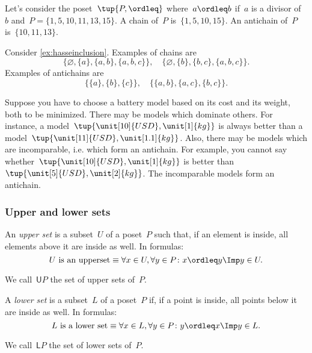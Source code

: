 \begin{example}
Let's consider the poset~$\tup{P,\ordleq}$ where~$a\ordleq b$ if~$a$ is a divisor of~$b$ and~$P=\{1,5,10,11,13,15\}$. A chain of~$P$ is~$\{1,5,10,15\}$. An antichain of~$P$ is~$\{10,11,13\}$.
\end{example}

\begin{example}
Consider \cref{ex:hasseinclusion}. Examples of chains are 
\begin{equation}
    \{\varnothing,\{a\},\{a,b\},\{a,b,c\}\}, \quad  \{\varnothing,\{b\},\{b,c\},\{a,b,c\}\}.
\end{equation}
Examples of antichains are
\begin{equation}
    \{\{a\},\{b\},\{c\}\}, \quad \{ \{a,b\},\{a,c\}, \{b,c\}\}.
\end{equation}
\end{example}

\begin{example}
\label{ex:battery}
Suppose you have to choose a battery model based on its cost and its weight, both to be minimized. There may be models which dominate others. For instance, a model~$\tup{\unit[10]{USD},\unit[1]{kg}}$ is always better than a model~$\tup{\unit[11]{USD},\unit[1.1]{kg}}$. Also, there may be models which are incomparable, i.e. which form an antichain. For example, you cannot say whether~$\tup{\unit[10]{USD},\unit[1]{kg}}$ is better than~$\tup{\unit[5]{USD},\unit[2]{kg}}$. The incomparable models form an antichain.
\end{example}

\subsubsection{Upper and lower sets}

\begin{definition}
\label{def:upperset}
An \emph{upper set} is a subset~$U$ of a poset~$P$ such
that, if an element is inside, all elements above it are inside as well.
In formulas:
\begin{equation}
\text{$U$ is an upperset} \equiv \forall x\in U, \forall y\in P\colon x\ordleq y \Imp y\in U.
\end{equation}
\end{definition}
\begin{remark}
We call~$\mathsf{U}P$ the set of upper sets of~$P$.
\end{remark}

\begin{definition}
\label{def:lowerset}
A \emph{lower set} is a subset~$L$ of a poset~$P$ if, if a point is inside, all points below it are inside as well. In formulas:
\begin{equation}
\text{$L$ is a lower set} \equiv \forall x\in L, \forall y\in P\colon y\ordleq x \Imp y\in L.
\end{equation}
\end{definition}
\begin{remark}
We call~$\mathsf{L}P$ the set of lower sets of~$P$.
\end{remark}

